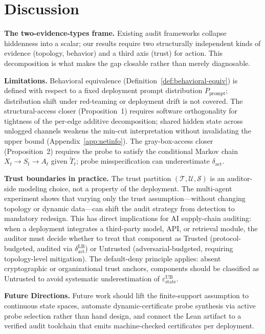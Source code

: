 \documentclass{article}
\begin{document}
\section{Discussion}
\label{sec:discussion}

\textbf{The two-evidence-types frame.} Existing audit frameworks collapse hiddenness into a scalar; our results require two structurally independent kinds of evidence (topology, behavior) and a third axis (trust) for action. This decomposition is what makes the gap closable rather than merely diagnosable.

\textbf{Limitations.} Behavioral equivalence (Definition~\ref{def:behavioral-equiv}) is defined with respect to a fixed deployment prompt distribution $P_\text{prompt}$; distribution shift under red-teaming or deployment drift is not covered. The structural-access closer (Proposition~1) requires software orthogonality for tightness of the per-edge additive decomposition; shared hidden state across unlogged channels weakens the min-cut interpretation without invalidating the upper bound (Appendix~\ref{app:netinfo}). The gray-box-access closer (Proposition~2) requires the probe to satisfy the conditional Markov chain $X_t \to S_t \to A_t$ given $\tilde T_t$; probe misspecification can underestimate $\delta_\text{act}$.

\textbf{Trust boundaries in practice.} The trust partition $(\mathcal{T}, \mathcal{U}, \mathcal{S})$ is an auditor-side modeling choice, not a property of the deployment. The multi-agent experiment shows that varying only the trust assumption---without changing topology or dynamic data---can shift the audit strategy from detection to mandatory redesign. This has direct implications for AI supply-chain auditing: when a deployment integrates a third-party model, API, or retrieval module, the auditor must decide whether to treat that component as Trusted (protocol-budgeted, audited via $\delta_\text{act}^\text{LB}$) or Untrusted (adversarial-budgeted, requiring topology-level mitigation). The default-deny principle applies: absent cryptographic or organizational trust anchors, components should be classified as Untrusted to avoid systematic underestimation of $\varepsilon_\text{state}^\text{UB}$.

\textbf{Future Directions.} Future work should lift the finite-support assumption to continuous state spaces, automate dynamic-certificate probe synthesis via active probe selection rather than hand design, and connect the Lean artifact to a verified audit toolchain that emits machine-checked certificates per deployment.
\end{document}
